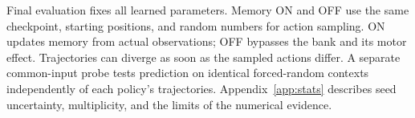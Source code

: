 Final evaluation fixes all learned parameters. Memory ON and OFF use the same checkpoint, starting positions, and random numbers for action sampling. ON updates memory from actual observations; OFF bypasses the bank and its motor effect. Trajectories can diverge as soon as the sampled actions differ. A separate common-input probe tests prediction on identical forced-random contexts independently of each policy's trajectories. Appendix~\ref{app:stats} describes seed uncertainty, multiplicity, and the limits of the numerical evidence.